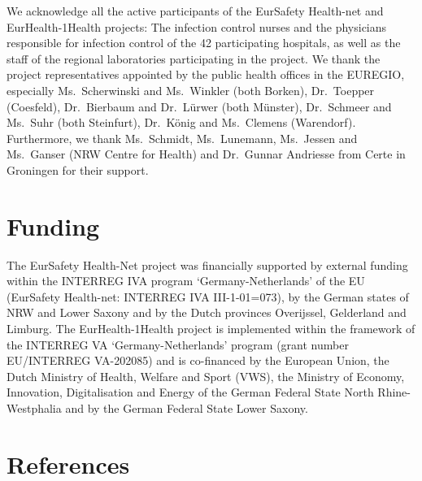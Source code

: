 \documentclass[
]{book}
\begin{document}
We acknowledge all the active participants of the EurSafety Health-net and EurHealth-1Health projects: The infection control nurses and the physicians responsible for infection control of the 42 participating hospitals, as well as the staff of the regional laboratories participating in the project. We thank the project representatives appointed by the public health offices in the EUREGIO, especially Ms.~Scherwinski and Ms.~Winkler (both Borken), Dr.~Toepper (Coesfeld), Dr.~Bierbaum and Dr.~Lürwer (both Münster), Dr.~Schmeer and Ms.~Suhr (both Steinfurt), Dr.~König and Ms.~Clemens (Warendorf). Furthermore, we thank Ms.~Schmidt, Ms.~Lunemann, Ms.~Jessen and Ms.~Ganser (NRW Centre for Health) and Dr.~Gunnar Andriesse from Certe in Groningen for their support.

\hypertarget{funding-1}{%
\section*{Funding}\label{funding-1}}

The EurSafety Health-Net project was financially supported by external funding within the INTERREG IVA program `Germany-Netherlands' of the EU (EurSafety Health-net: INTERREG IVA III-1-01=073), by the German states of NRW and Lower Saxony and by the Dutch provinces Overijssel, Gelderland and Limburg. The EurHealth-1Health project is implemented within the framework of the INTERREG VA `Germany-Netherlands' program (grant number EU/INTERREG VA-202085) and is co-financed by the European Union, the Dutch Ministry of Health, Welfare and Sport (VWS), the Ministry of Economy, Innovation, Digitalisation and Energy of the German Federal State North Rhine-Westphalia and by the German Federal State Lower Saxony.

\hypertarget{references-8}{%
\section*{References}\label{references-8}}
\end{document}
